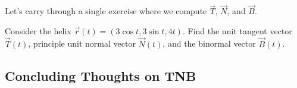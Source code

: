 Let's carry through a single exercise where we compute $\vec T$, $\vec N$, and $\vec B$. 

\begin{problem} \label{helix example of T N and B}
%
Consider the helix $\vec r(t) = (3\cos t,3\sin t, 4t)$.  Find the unit tangent vector $\vec T(t)$, principle unit normal vector $\vec N(t)$, and the binormal vector $\vec B(t)$. 
\end{problem}

\clearpage

\subsection{Concluding Thoughts on TNB}







